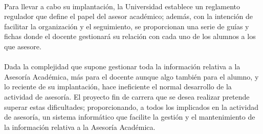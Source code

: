 \paragraph{}Para llevar a cabo su implantación, la Universidad establece un
reglamento regulador que define el papel del asesor académico; además, con la
intención de facilitar la organización y el seguimiento, se proporcionan una
serie de guías y fichas donde el docente gestionará su relación con cada uno de
los alumnos a los que asesore.

\paragraph{}Dada la complejidad que supone gestionar toda la información
relativa a la Asesoría Académica, más para el docente aunque algo también para
el alumno, y lo reciente de su implantación, hace ineficiente el normal
desarrollo de la actividad de asesoría. El proyecto fin de carrera que se desea
realizar pretende superar estas dificultades; proporcionando, a todos los
implicados en la actividad de asesoría, un sistema informático que facilite la
gestión y el mantenimiento de la información relativa a la Asesoría Académica.
